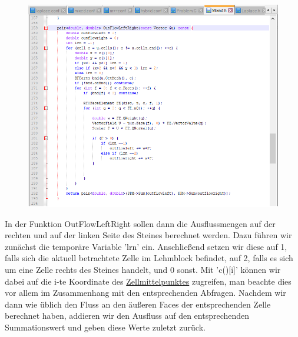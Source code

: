 \begin{figure}[H]
	\centering
	\includegraphics[width=\textwidth]{../../19/mixedoutflow.png}
	
\end{figure}
In der Funktion OutFlowLeftRight sollen dann die Ausflussmengen auf der rechten und auf der linken Seite des Steines berechnet werden. 
Dazu führen wir zunächst die temporäre Variable 'lrn' ein. Anschließend setzen wir diese auf 1, falls sich die aktuell betrachtete Zelle im Lehmblock befindet, auf 2, falls es sich um eine Zelle rechts des Steines handelt, und 0 sonst. \newline
Mit 'c()[i]' können wir dabei auf die i-te Koordinate des \underline{Zellmittelpunktes} zugreifen, man beachte dies vor allem im Zusammenhang mit den entsprechenden Abfragen. 
Nachdem wir dann wie üblich den Fluss an den äußeren Faces der entsprechenden Zelle berechnet haben, addieren wir den Ausfluss auf den entsprechenden Summationswert und geben diese Werte zuletzt zurück.

